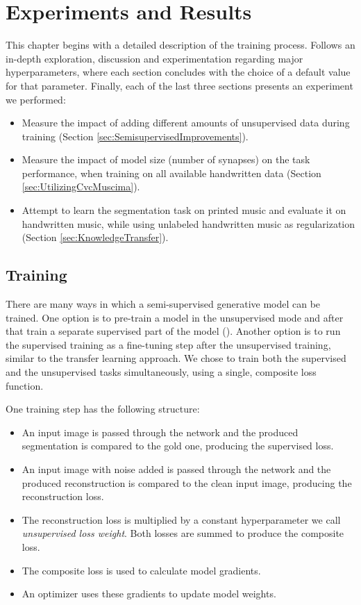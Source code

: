 \chapter{Experiments and Results}
\label{chap:ExperimentsAndResults}


This chapter begins with a detailed description of the training process. Follows an in-depth exploration, discussion and experimentation regarding major hyperparameters, where each section concludes with the choice of a default value for that parameter. Finally, each of the last three sections presents an experiment we performed:

\begin{itemize}
    \item Measure the impact of adding different amounts of unsupervised data during training (Section \ref{sec:SemisupervisedImprovements}).
    \item Measure the impact of model size (number of synapses) on the task performance, when training on all available handwritten data (Section \ref{sec:UtilizingCvcMuscima}).
    \item Attempt to learn the segmentation task on printed music and evaluate it on handwritten music, while using unlabeled handwritten music as regularization (Section \ref{sec:KnowledgeTransfer}).
\end{itemize}


\section{Training}
\label{sec:Training}

There are many ways in which a semi-supervised generative model can be trained. One option is to pre-train a model in the unsupervised mode and after that train a separate supervised part of the model (\cite{KingmaSslVae}). Another option is to run the supervised training as a fine-tuning step after the unsupervised training, similar to the transfer learning approach. We chose to train both the supervised and the unsupervised tasks simultaneously, using a single, composite loss function.

One training step has the following structure:

\begin{itemize}
    \item An input image is passed through the network and the produced segmentation is compared to the gold one, producing the supervised loss.
    \item An input image with noise added is passed through the network and the produced reconstruction is compared to the clean input image, producing the reconstruction loss.
    \item The reconstruction loss is multiplied by a constant hyperparameter we call \emph{unsupervised loss weight}. Both losses are summed to produce the composite loss.
    \item The composite loss is used to calculate model gradients.
    \item An optimizer uses these gradients to update model weights.
\end{itemize}

